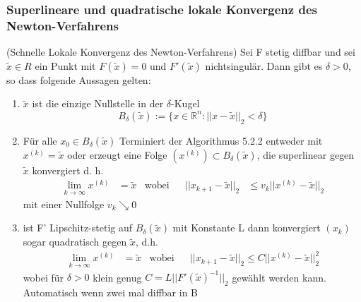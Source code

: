 \documentclass[
	ngerman,
	accentcolor=9c,%
	type=intern,
	marginpar=false
	]{tudapub}
\begin{document}
            \subsubsection{Superlineare und quadratische lokale Konvergenz des Newton-Verfahrens}
                \begin{satz}
                    (Schnelle Lokale Konvergenz des Newton-Verfahrens) Sei F stetig diffbar und sei $\tilde{x} \in R$ ein Punkt mit $F(\tilde{x}) = 0$ und $F'(\tilde{x})$ nichtsingulär.
                    Dann gibt es $\delta > 0$, so dass folgende Aussagen gelten:
                    \begin{enumerate}[label=\roman*)]
                        \item $\tilde{x}$ ist die einzige Nullstelle in der $\delta$-Kugel
                        \begin{equation*}
                            B_\delta(\tilde{x}) := \{x \in \mathbb{R}^n: ||x-\tilde{x}||_2 < \delta \}
                        \end{equation*}
                        \item Für alle $x_0 \in B_\delta(\tilde{x})$ Terminiert der Algorithmus 5.2.2 entweder mit $x^{(k)} = \tilde{x}$ oder erzeugt eine Folge $(x^{(k)}) \subset B_\delta(\tilde{x})$, die superlinear gegen
                        $\tilde{x}$ konvergiert d. h.
                        \begin{align*}
                            \lim_{k \rightarrow \infty} x^{(k)} &= \tilde{x} &\text{wobei}&& ||x_{k+1}-\tilde{x}||_2 &\leq v_k||x^{(k)} - \tilde{x}||_2
                        \end{align*}
                        mit einer Nullfolge $v_k \searrow 0$
                        \item ist F' Lipschitz-stetig auf $B_\delta(\tilde{x})$ mit Konstante L
                        dann konvergiert $(x_k)$ sogar quadratisch gegen $\tilde{x}$, d.h.
                        \begin{align*}
                            \lim_{k \rightarrow \infty} x^{(k)} &= \tilde{x} & \text{wobei} && ||x_{k+1} - \tilde{x}||_2 \leq C ||x^{(k)} - \tilde{x}||_2^2
                        \end{align*}
                        wobei für $\delta > 0$ klein genug $C = L ||F'(\tilde{x})^{-1}||_2$ gewählt werden kann.
                        Automatisch wenn zwei mal diffbar in B
                    \end{enumerate}
                    
                \end{satz}
\end{document}
